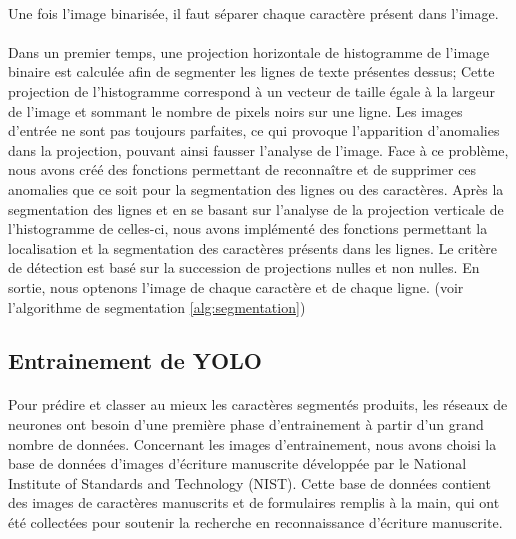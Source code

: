 \documentclass[a4paper]{article}
\begin{document}
				\paragraph{} Une fois l'image binarisée, il faut séparer chaque caractère présent dans l'image.
				
				\paragraph{} Dans un premier temps, une projection horizontale de histogramme de l'image binaire est calculée afin de segmenter les lignes de texte présentes dessus; 
				Cette projection de l'histogramme correspond à un vecteur de taille égale à la largeur de l'image et sommant le nombre de pixels noirs sur une ligne. %
				\newline Les images d'entrée ne sont pas toujours parfaites, ce qui provoque l'apparition d'anomalies dans la projection, pouvant ainsi fausser l'analyse de l'image. Face à ce problème, nous avons créé des fonctions permettant de reconnaître et de supprimer ces anomalies que ce soit pour la segmentation des lignes ou des caractères.
				\newline Après la segmentation des lignes et en se basant sur l'analyse de la projection verticale de l'histogramme de celles-ci, nous avons implémenté des fonctions permettant la localisation et la segmentation des caractères présents dans les lignes. 
				Le critère de détection est basé sur la succession de projections nulles et non nulles. En sortie, nous optenons l'image de chaque caractère et de chaque ligne.
				(voir l'algorithme de segmentation \ref{alg:segmentation})
			
		
		

			\hspace*{1.5cm}

		\subsection{Entrainement de YOLO}

			\paragraph{} Pour prédire et classer au mieux les caractères segmentés produits, les réseaux de neurones ont besoin d'une première phase d'entrainement à partir d'un grand nombre de données.
			Concernant les images d'entrainement, nous avons choisi la base de données d'images d'écriture manuscrite développée par le National Institute of Standards and Technology (NIST).
			Cette base de données contient des images de caractères manuscrits et de formulaires remplis à la main, qui ont été collectées pour soutenir la recherche en reconnaissance d'écriture manuscrite.
			
\end{document}
